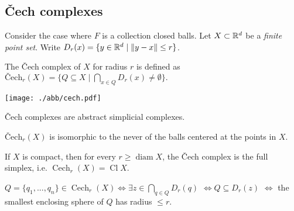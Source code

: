 \begin{multicols*}{3}
\subsection{Čech complexes} 
{\myfont Consider the case where $F$ is a collection closed balls.} Let $X\subset \mathbb{R}^d$ be a \emph{finite point set}. Write $D_r(x) = \{y\in \mathbb{R}^d \mid \|y-x\|\leq r\}$.\vspace{-0.6pc}
\begin{definition}
The Čech complex of $X$ for radius $r$ is defined as
$
\text{Čech}_r(X) = \{Q \subseteq X \mid \bigcap_{x\in Q}D_r(x)\neq \emptyset \}.
$
\begin{center}
\vspace{-0.8pc}
\texttt{[image: ./abb/cech.pdf]}
\vspace{-0.8pc}
\end{center}
\end{definition}
\rspace \columnbreak
\begin{rem}
Čech complexes are abstract simplicial complexes. 
\end{rem}
\rspace
\begin{rem}
$\text{Čech}_r(X)$ is isomorphic to the never of the balls centered at the points in $X$.
\end{rem}
\rspace
\begin{rem}
If $X$ is compact, then for every $r\geq \operatorname{diam} X$, the Čech complex is the full simplex, i.e. $\operatorname{Cech}_r(X)=\operatorname{Cl} X$.
\end{rem}
\rspace
\begin{remark}
$Q=\{q_1,...,q_n\} \in \operatorname{Cech}_r(X)  \iff \exists z \in\bigcap_{q\in Q}D_r(q) $ $\iff Q\subseteq D_r(z)$ $\iff $ the smallest enclosing sphere of $Q$ has radius $\leq r$.
\end{remark}
\rspace
\drawaline\\\vspace{-0.5pc}

\end{multicols*}
